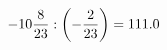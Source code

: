 \documentclass[preview]{standalone}
\begin{document}
\begin{align*}
-10 { 8 \over 23 }  :  \left( - { 2 \over 23 } \right) = 111.0
\end{align*}
\end{document}
